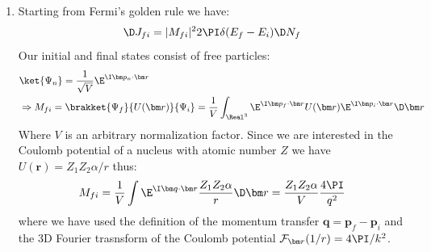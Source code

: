\documentclass[fleqn, 12pt]{article}
\begin{document}
\begin{enumerate}
\item Starting from Fermi's golden rule we have:
  \begin{align*}
    \D J_{f i} = |M_{f i}|^2 2 \PI \delta(E_f - E_i) \D N_{f}
  \end{align*}
  Our initial and final states consist of free particles:
  \begin{align*}
    &\ket{\Psi_n} = \frac{1}{\sqrt V} \E^{\I \bm p_n \cdot \bm r} \\
    &\Rightarrow M_{f i}
      = \brakket{\Psi_f}{U(\bm r)}{\Psi_i}
      = \frac{1}{V} \int_{\Real^3}
      \E^{\I \bm p_f \cdot \bm r} U(\bm r) \E^{\I \bm p_i \cdot \bm r} \D \bm r
  \end{align*}
  Where $V$ is an arbitrary normalization factor. Since we are interested in
  the Coulomb potential of a nucleus with atomic number $Z$ we have
  $U(\bm r) = Z_1 Z_2 \alpha / r$ thus:
  \begin{align*}
    M_{fi} = \frac{1}{V} \int \E^{\I \bm q \cdot \bm r} \frac{Z_1 Z_2 \alpha}{r} \D \bm r
    = \frac{Z_1 Z_2 \alpha}{V} \frac{4 \PI}{q^2}
  \end{align*}
  where we have used the definition of the momentum transfer
  $\bm q = \bm p_f - \bm p_i$ and the 3D Fourier trasnsform of the Coulomb
  potential $\mathcal F_{\bm r} (1 / r) = 4 \PI / k^2$.


\end{enumerate}
\end{document}
